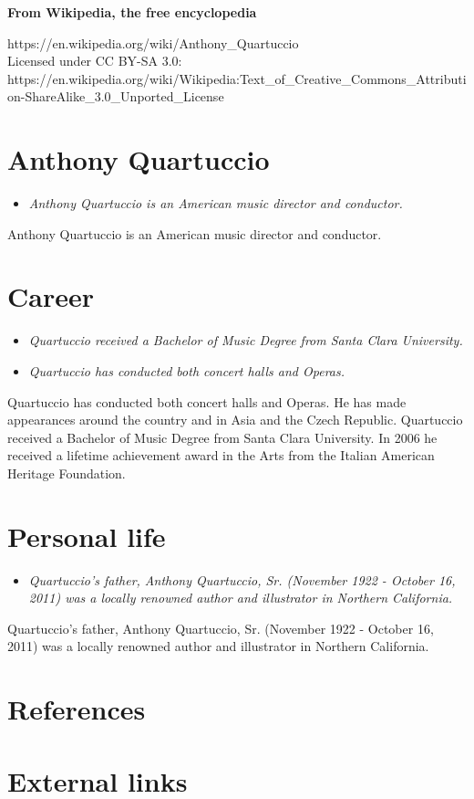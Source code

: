 \textbf{From Wikipedia, the free encyclopedia}

https://en.wikipedia.org/wiki/Anthony\_Quartuccio\\
Licensed under CC BY-SA 3.0:\\
https://en.wikipedia.org/wiki/Wikipedia:Text\_of\_Creative\_Commons\_Attribution-ShareAlike\_3.0\_Unported\_License

\section{Anthony Quartuccio}\label{anthony-quartuccio}

\begin{itemize}
\item
  \emph{Anthony Quartuccio is an American music director and conductor.}
\end{itemize}

Anthony Quartuccio is an American music director and conductor.

\section{Career}\label{career}

\begin{itemize}
\item
  \emph{Quartuccio received a Bachelor of Music Degree from Santa Clara
  University.}
\item
  \emph{Quartuccio has conducted both concert halls and Operas.}
\end{itemize}

Quartuccio has conducted both concert halls and Operas. He has made
appearances around the country and in Asia and the Czech Republic.
Quartuccio received a Bachelor of Music Degree from Santa Clara
University. In 2006 he received a lifetime achievement award in the Arts
from the Italian American Heritage Foundation.

\section{Personal life}\label{personal-life}

\begin{itemize}
\item
  \emph{Quartuccio's father, Anthony Quartuccio, Sr. (November 1922 -
  October 16, 2011) was a locally renowned author and illustrator in
  Northern California.}
\end{itemize}

Quartuccio's father, Anthony Quartuccio, Sr. (November 1922 - October
16, 2011) was a locally renowned author and illustrator in Northern
California.

\section{References}\label{references}

\section{External links}\label{external-links}
